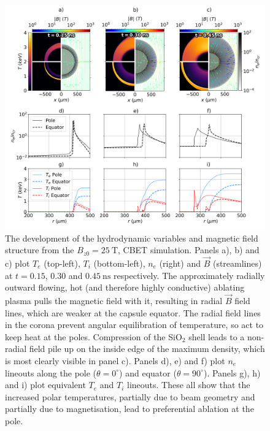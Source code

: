 \begin{figure}[t!]
    \includegraphics[width=\linewidth]{Results2/Images/mag_early_B_develop.png}
    \centering
    \caption{The development of the hydrodynamic variables and magnetic field structure from the $B_{z0}=25\ \text{T}$, \ac{CBET} simulation.
    Panels a), b) and c) plot $T_e$ (top-left), $T_i$ (bottom-left), $n_e$ (right) and $\vec{B}$ (streamlines) at $t=0.15$, $0.30$ and $0.45\ \text{ns}$ respectively.
    The approximately radially outward flowing, hot (and therefore highly conductive) ablating plasma pulls the magnetic field with it, resulting in radial $\vec{B}$ field lines, which are weaker at the capsule equator.
    The radial field lines in the corona prevent angular equilibration of temperature, so act to keep heat at the poles.
    Compression of the SiO${}_2$ shell leads to a non-radial field pile up on the inside edge of the maximum density, which is most clearly visible in panel c).
    Panels d), e) and f) plot $n_e$ lineouts along the pole ($\theta=0^{\circ}$) and equator ($\theta=90^{\circ}$).
    Panels g), h) and i) plot equivalent $T_e$ and $T_i$ lineouts.
    These all show that the increased polar temperatures, partially due to beam geometry and partially due to magnetisation, lead to preferential ablation at the pole.}%
    \label{fig:Res2_mag_early_B_develop}
\end{figure}




